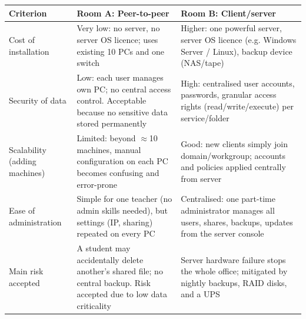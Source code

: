 \documentclass[11pt]{article}
\begin{document}
\begin{exemplebox}
\begin{center}
\begin{tabularx}{\linewidth}{|l|X|X|}
\hline
\rowcolor{popblueL} \textbf{Criterion} & \textbf{Room A: Peer-to-peer} & \textbf{Room B: Client/server} \\
\hline
Cost of installation & Very low: no server, no server OS licence; uses existing 10 PCs and one switch & Higher: one powerful server, server OS licence (e.g. Windows Server / Linux), backup device (NAS/tape) \\
\hline
Security of data & Low: each user manages own PC; no central access control. Acceptable because no sensitive data stored permanently & High: centralised user accounts, passwords, granular access rights (read/write/execute) per service/folder \\
\hline
Scalability (adding machines) & Limited: beyond $\approx$10 machines, manual configuration on each PC becomes confusing and error-prone & Good: new clients simply join domain/workgroup; accounts and policies applied centrally from server \\
\hline
Ease of administration & Simple for one teacher (no admin skills needed), but settings (IP, sharing) repeated on every PC & Centralised: one part-time administrator manages all users, shares, backups, updates from the server console \\
\hline
Main risk accepted & A student may accidentally delete another's shared file; no central backup. Risk accepted due to low data criticality & Server hardware failure stops the whole office; mitigated by nightly backups, RAID disks, and a UPS \\
\hline
\end{tabularx}
\end{center}
\end{exemplebox}
\end{document}
